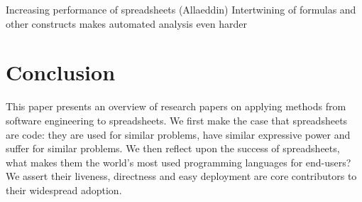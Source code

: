 \documentclass[conference]{IEEEtran}
\begin{document}
Increasing performance of spreadsheets (Allaeddin)
Intertwining of formulas and other constructs makes automated analysis even harder



\section{Conclusion}
This paper presents an overview of research papers on applying methods from software engineering to spreadsheets. We first make the case that spreadsheets are code: they are used for similar problems, have similar expressive power and suffer for similar problems. We then reflect upon the success of spreadsheets, what makes them the world's most used programming languages for end-users? We assert their liveness, directness and easy deployment are core contributors to their widespread adoption. 












\end{document}
